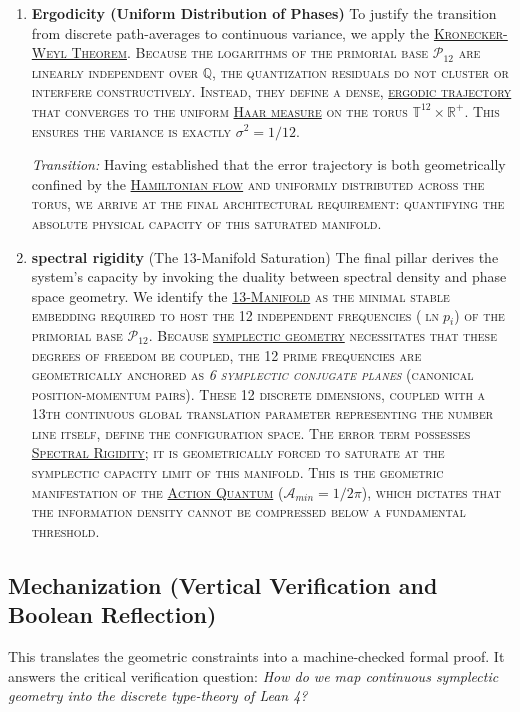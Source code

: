 \documentclass[sn-mathphys-num, pdflatex, referee]{sn-jnl}
\newcommand{\gterm}[2]{\begingroup\normalfont\scshape\hyperlink{#1}{#2}\endgroup}
\begin{document}
\begin{enumerate}
    \item \textbf{Ergodicity (Uniform Distribution of Phases)}
    To justify the transition from discrete path-averages to continuous variance, we apply the \gterm{weyl}{Kronecker-Weyl Theorem}. Because the logarithms of the primorial base $\mathcal{P}_{12}$ are linearly independent over $\mathbb{Q}$, the quantization residuals do not cluster or interfere constructively. Instead, they define a dense, \gterm{ergodic}{ergodic trajectory} that converges to the uniform \gterm{haar}{Haar measure} on the torus $\mathbb{T}^{12} \times \mathbb{R}^+$. This ensures the variance is exactly $\sigma^2 = 1/12$.

    \noindent\textit{Transition:} Having established that the error trajectory is both geometrically confined by the \gterm{hamiltonian}{Hamiltonian flow} and uniformly distributed across the torus, we arrive at the final architectural requirement: quantifying the absolute physical capacity of this saturated manifold.

    \item \textbf{spectral rigidity} (The 13-Manifold Saturation)
    The final pillar derives the system's capacity by invoking the duality between spectral density and phase space geometry. We identify the \gterm{m13}{13-Manifold} as the minimal stable embedding required to host the 12 independent frequencies ($\ln p_i$) of the primorial base $\mathcal{P}_{12}$. Because \gterm{geometry}{symplectic geometry} necessitates that these degrees of freedom be coupled, the 12 prime frequencies are geometrically anchored as \textit{6 symplectic conjugate planes} (canonical position-momentum pairs). These 12 discrete dimensions, coupled with a 13th continuous global translation parameter representing the number line itself, define the configuration space. The error term possesses \gterm{spectral}{Spectral Rigidity}; it is geometrically forced to saturate at the symplectic capacity limit of this manifold. This is the geometric manifestation of the \gterm{action_quantum}{Action Quantum} ($\mathcal{A}_{min} = 1/2\pi$), which dictates that the information density cannot be compressed below a fundamental threshold.
\end{enumerate}
    \subsection{Mechanization (Vertical Verification and Boolean Reflection)} 
    This translates the geometric constraints into a machine-checked formal proof. It answers the critical verification question: \textit{How do we map continuous symplectic geometry into the discrete type-theory of Lean 4?}
\end{document}
